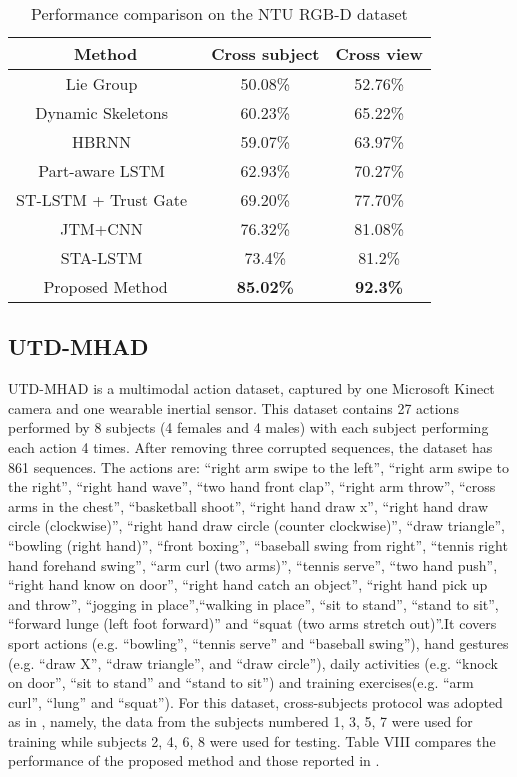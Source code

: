 \documentclass[10pt,journal]{IEEEtran}
\begin{document}
\begin{table}[htb]
\begin{center}
\caption{Performance comparison on the NTU RGB-D dataset \cite{Shahroudy2016NTU}} \label{tab:NTU}
\begin{tabular}{  c  c  c }
\hline
Method              &Cross subject &Cross view \\
\hline
Lie Group~\cite{Vemulapalli2014Human} & 50.08\% & 52.76\% \\
Dynamic Skeletons~\cite{Ohnbar2013Joint} &60.23\% &65.22\% \\
HBRNN~\cite{Du2015Hierarchical} &59.07\% &63.97\% \\
Part-aware LSTM~\cite{Shahroudy2016NTU} &62.93\% &70.27\% \\
ST-LSTM + Trust Gate~\cite{Liu2016Spatio} &69.20\% & 77.70\% \\
JTM+CNN~\cite{Wang2016Action} & 76.32\% &81.08\% \\
STA-LSTM~\cite{Song2016An} &73.4\% &81.2\% \\
Proposed Method     & \bf{85.02\%} &\bf{92.3\%} \\
\hline
\end{tabular}
\end{center}
\end{table}

\subsection{UTD-MHAD}
UTD-MHAD \cite{Chen2015UTD} is a multimodal action dataset, captured
by one Microsoft Kinect camera and one wearable inertial
sensor. This dataset contains 27 actions performed by 8
subjects (4 females and 4 males) with each subject performing each action 4 times. After removing three corrupted sequences, the dataset has 861 sequences. The actions are: “right arm swipe to the left”, “right arm swipe to the right”, “right hand wave”, “two hand front clap”, “right arm throw”, “cross arms in the chest”, “basketball shoot”, “right hand draw x”, “right hand draw circle (clockwise)”, “right hand draw circle (counter clockwise)”, “draw triangle”, “bowling (right hand)”,
“front boxing”, “baseball swing from right”, “tennis right hand forehand swing”, “arm curl (two arms)”, “tennis serve”, “two hand push”, “right hand know on door”, “right hand catch an object”, “right hand pick up and throw”, “jogging in place”,“walking in place”, “sit to stand”, “stand to sit”, “forward lunge (left foot forward)” and “squat (two arms stretch out)”.It covers sport actions (e.g. “bowling”, “tennis serve” and “baseball swing”), hand gestures (e.g. “draw X”, “draw triangle”, and “draw circle”), daily activities (e.g. “knock on door”, “sit to stand” and “stand to sit”) and training exercises(e.g. “arm curl”, “lung” and “squat”). For this dataset, cross-subjects protocol was adopted as in \cite{Chen2015UTD}, namely, the data from the subjects numbered 1, 3, 5, 7 were used for training while subjects 2, 4, 6, 8 were used for testing. Table VIII compares the performance of the proposed method and those reported in \cite{Chen2015UTD}.
\end{document}
